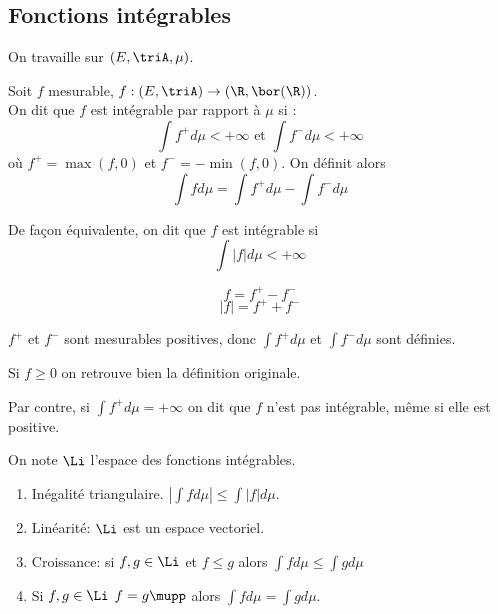 \subsection{Fonctions intégrables}

On travaille sur $(E, \triA, \mu)$.

\begin{definition}
	Soit $f$ mesurable, $f : (E, \triA) \to (\R, \bor(\R))$.\\
	On dit que $f$ est intégrable par rapport à $\mu$ si :
	$$\int f^+ d\mu < +\infty \text{ et } \int f^- d\mu < +\infty$$
	où $f^+ = \max(f,0)$ et $f^- = -\min(f,0)$.
	On définit alors
	$$ \int f d\mu = \int f^+ d\mu - \int f^- d\mu $$
\end{definition}

\begin{remarque}
	De façon équivalente, on dit que $f$ est intégrable si
	$$ \int |f| d\mu < +\infty$$
\end{remarque}

\begin{remarque}
	$$ f = f^+ - f^- $$
	$$ |f| = f^+ + f^- $$
\end{remarque}

\begin{remarque}
	$f^+$ et $f^-$ sont mesurables positives, donc $\int f^+d\mu$ et $\int f^- d\mu$ sont définies.
\end{remarque}

\begin{remarque}
	Si $f \geq 0$ on retrouve bien la définition originale.
\end{remarque}

\begin{remarque}
	Par contre, si $\int f^+ d\mu = +\infty$ on dit que $f$ n'est pas intégrable, même si elle est positive.
\end{remarque}


\begin{definition}
	On note $\Li$ l'espace des fonctions intégrables.
\end{definition}

\begin{prop}
	\begin{enumerate}
		\item Inégalité triangulaire. $\left| \int f d\mu \right| \leq \int |f| d \mu$.
		\item Linéarité: $\Li$ est un espace vectoriel.
		\item Croissance: si $f,g \in \Li$ et $f\leq g$ alors $\int f d\mu \leq \int g d\mu$
		\item Si $f,g \in \Li$ $f = g \mupp$ alors $\int f d\mu = \int g d\mu$.
	\end{enumerate}
\end{prop}

